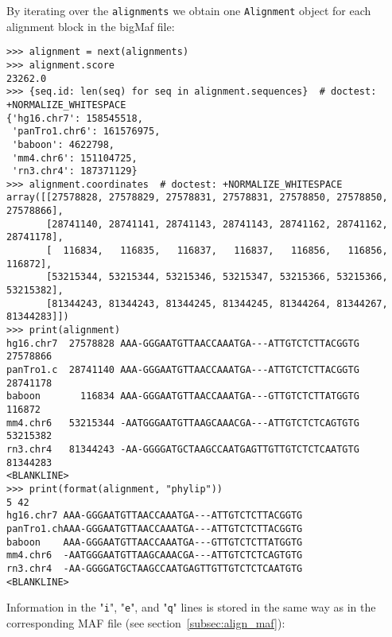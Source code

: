 By iterating over the \verb|alignments| we obtain one \verb|Alignment| object for each alignment block in the bigMaf file:
\begin{verbatim}
>>> alignment = next(alignments)
>>> alignment.score
23262.0
>>> {seq.id: len(seq) for seq in alignment.sequences}  # doctest: +NORMALIZE_WHITESPACE
{'hg16.chr7': 158545518,
 'panTro1.chr6': 161576975,
 'baboon': 4622798,
 'mm4.chr6': 151104725,
 'rn3.chr4': 187371129}
>>> alignment.coordinates  # doctest: +NORMALIZE_WHITESPACE
array([[27578828, 27578829, 27578831, 27578831, 27578850, 27578850, 27578866],
       [28741140, 28741141, 28741143, 28741143, 28741162, 28741162, 28741178],
       [  116834,   116835,   116837,   116837,   116856,   116856, 116872],
       [53215344, 53215344, 53215346, 53215347, 53215366, 53215366, 53215382],
       [81344243, 81344243, 81344245, 81344245, 81344264, 81344267, 81344283]])
>>> print(alignment)
hg16.chr7  27578828 AAA-GGGAATGTTAACCAAATGA---ATTGTCTCTTACGGTG 27578866
panTro1.c  28741140 AAA-GGGAATGTTAACCAAATGA---ATTGTCTCTTACGGTG 28741178
baboon       116834 AAA-GGGAATGTTAACCAAATGA---GTTGTCTCTTATGGTG   116872
mm4.chr6   53215344 -AATGGGAATGTTAAGCAAACGA---ATTGTCTCTCAGTGTG 53215382
rn3.chr4   81344243 -AA-GGGGATGCTAAGCCAATGAGTTGTTGTCTCTCAATGTG 81344283
<BLANKLINE>
>>> print(format(alignment, "phylip"))
5 42
hg16.chr7 AAA-GGGAATGTTAACCAAATGA---ATTGTCTCTTACGGTG
panTro1.chAAA-GGGAATGTTAACCAAATGA---ATTGTCTCTTACGGTG
baboon    AAA-GGGAATGTTAACCAAATGA---GTTGTCTCTTATGGTG
mm4.chr6  -AATGGGAATGTTAAGCAAACGA---ATTGTCTCTCAGTGTG
rn3.chr4  -AA-GGGGATGCTAAGCCAATGAGTTGTTGTCTCTCAATGTG
<BLANKLINE>
\end{verbatim}
Information in the "\verb|i|", "\verb|e|", and "\verb|q|" lines is stored in the same way as in the corresponding MAF file (see section~\ref{subsec:align_maf}):
